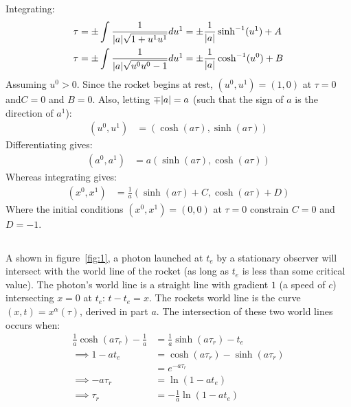 \documentclass[a4paper]{article}
\begin{document}
Integrating:
\begin{align*}
\tau &= \pm \int \frac{1}{\abs{a}\sqrt{1 + u^1 u^1}} du^1 = \pm \frac{1}{\abs{a}}\sinh^{-1}(u^1) + A\\
\tau &= \pm \int \frac{1}{\abs{a}\sqrt{u^0 u^0 - 1}} du^1 = \pm \frac{1}{\abs{a}}\cosh^{-1}(u^0) + B
\end{align*}
Assuming $u^0 > 0$. Since the rocket begins at rest, $(u^0, u^1) = (1, 0)$ at $\tau = 0$ and$C = 0$ and $B = 0$. Also, letting $\mp \abs{a} = a$ (such that the sign of $a$ is the direction of $a^1$):
\begin{align*}
(u^0, u^1) &= (\cosh(a \tau), \sinh(a\tau))
\end{align*}
Differentiating gives:
\begin{align*}
	(a^0, a^1) &= a(\sinh(a \tau), \cosh(a\tau))
\end{align*}
Whereas integrating gives:
\begin{align*}
	(x^0, x^1) &= \frac{1}{a}(\sinh(a \tau) + C, \cosh(a\tau) + D)
\end{align*}
Where the initial conditions $(x^0, x^1) = (0, 0)$ at $\tau = 0$ constrain $C = 0$ and $D = -1$.



\subsection{}
A shown in figure~\ref{fig:1}, a photon launched at $t_e$ by a stationary observer will intersect with the world line of the rocket (as long as $t_e$ is less than some critical value). 
The photon's world line is a straight line with gradient $1$ (a speed of $c$) intersecting $x=0$ at $t_e$: $t -  t_e = x$.
The rockets world line is the curve $(x, t) = x^\alpha(\tau)$, derived in part $a$.
The intersection of these two world lines occurs when:
\begin{align*}
	\frac{1}{a}\cosh(a\tau_r) - \frac{1}{a} &= \frac{1}{a} \sinh(a\tau_r) - t_e\\
	\implies 1-at_e &= \cosh(a\tau_r) - \sinh(a\tau_r) \\
	&= e^{-a \tau_r}\\
	\implies -a \tau_r &= \ln(1-at_e)\\
	\implies \tau_r &= -\frac{1}{a} \ln(1-at_e)\\
\end{align*}



\subsection{}
\end{document}
